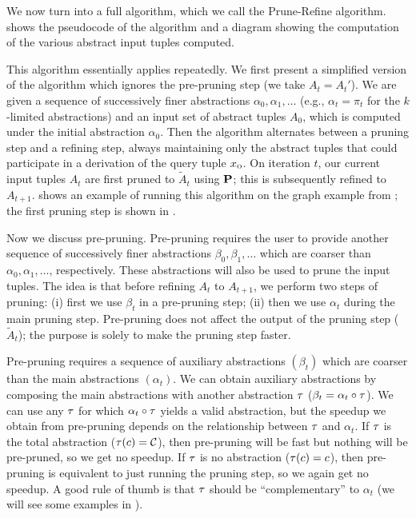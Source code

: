 We now turn  into a full algorithm, which we call the
Prune-Refine algorithm.   shows the pseudocode
of the algorithm and a diagram showing the computation of the various abstract
input tuples computed.

This algorithm essentially applies  repeatedly.
We first present a simplified version of the algorithm which
ignores the pre-pruning step (we take $A_t = A_t'$).
We are given a sequence of successively finer abstractions $\alpha_0, \alpha_1, \dots$
(e.g., $\alpha_t = \pi_t$ for the $k$-limited abstractions)
and an input set of abstract tuples $A_0$, which is computed
under the initial abstraction $\alpha_0$.  Then the algorithm alternates between a pruning step
and a refining step, always maintaining only the abstract tuples
that could participate in a derivation of the query tuple $x_\text{\sc o}$.
On iteration $t$, our current input tuples $A_t$ are first pruned to $\tilde A_t$ using $\mathbf{P}$;
this is subsequently refined to $A_{t+1}$.
 shows an example of running this algorithm on the graph
example from ; the first pruning step is shown in
.


Now we discuss pre-pruning.  Pre-pruning requires the user to provide
another sequence of successively finer abstractions $\beta_0, \beta_1, \dots$
which are coarser than $\alpha_0, \alpha_1, \dots$, respectively.
These abstractions will also be used to prune the input tuples.
The idea is that before refining $A_t$ to $A_{t+1}$,
we perform two steps of pruning:
(i) first we use $\beta_t$ in a pre-pruning step;
(ii) then we use $\alpha_t$ during the main pruning step.
Pre-pruning does not affect the output of the pruning step ($\tilde A_t$);
the purpose is solely to make the pruning step faster.

Pre-pruning requires a sequence of auxiliary abstractions $(\beta_t)$ which are coarser than the main abstractions $(\alpha_t)$.
We can obtain auxiliary abstractions by composing the main abstractions
with another abstraction $\tau$ ($\beta_t = \alpha_t \circ \tau$).
We can use any $\tau$ for which $\alpha_t \circ \tau$ yields a valid abstraction,
but the speedup we obtain from pre-pruning depends on the relationship between $\tau$ and $\alpha_t$.
If $\tau$ is the total abstraction ($\tau(c) = \mathcal{C}$), then pre-pruning will be fast but nothing will be pre-pruned,
so we get no speedup.
If $\tau$ is no abstraction ($\tau(c) = c$), then pre-pruning is equivalent to just running the pruning step,
so we again get no speedup.
A good rule of thumb is that $\tau$ should be ``complementary'' to $\alpha_t$
(we will see some examples in ).

